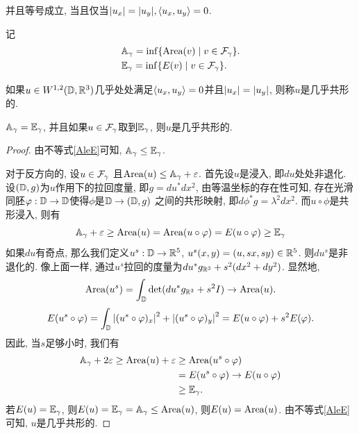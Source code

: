 并且等号成立, 当且仅当${\left | u_x \right |}={\left | u_y \right |}, {\left < u_x, u_y \right >}=0$.
\par 记
\begin{align}
    &{\mathbb{A}_\gamma}=\inf\{\text{Area}(v)\mid v \in {\mathcal{F}_\gamma}\}.\\
    &{\mathbb{E}_\gamma}=\inf \{{E}(v)\mid v \in {\mathcal{F}_\gamma}\}.
\end{align}
\begin{definition}
    如果$u \in W^{1,2}(\mathbb{D},{\mathbb{R}}^3)$几乎处处满足${\left < u_x, u_y \right >}=0$并且${\left | u_x \right |} = {\left | u_y \right |}$, 则称$u$是几乎共形的.
\end{definition}
\begin{lemma}\label{ageg}
    ${\mathbb{A}_\gamma}={\mathbb{E}_\gamma}$, 并且如果$u \in {\mathcal{F}_\gamma}$取到${\mathbb{E}_\gamma}$, 则$u$是几乎共形的.
\end{lemma}
\begin{proof}
    由不等式\eqref{AleE}可知, ${\mathbb{A}_\gamma} \le {\mathbb{E}_\gamma}$.
    \par 对于反方向的, 设$u\in {\mathcal{F}_\gamma}$ 且$\text{Area}(u) \le {\mathbb{A}_\gamma} + \varepsilon$. 首先设$u$是浸入, 即$du$处处非退化. 设$({\mathbb{D}},g)$为$u$作用下的拉回度量, 即$g=du^*dx^2$, 由等温坐标的存在性可知, 存在光滑同胚${\varphi}: {\mathbb{D}} \to {\mathbb{D}}$使得$\phi$是$\mathbb{D} \to ({\mathbb{D}},g)$ 之间的共形映射, 即$d\phi ^* g=\lambda^2dx^2$. 而$u\circ \phi$是共形浸入, 则有
    \begin{equation}
        {\mathbb{A}_\gamma}+\varepsilon\ge \text{Area}(u)=\text{Area}(u\circ {\varphi})={E}(u\circ {\varphi}) \ge {\mathbb{E}_\gamma}
    \end{equation}
    如果$du$有奇点, 那么我们定义$u^s: {\mathbb{D}} \to {\mathbb{R}}^5$, $u^s(x,y)=(u,sx,sy)\in {\mathbb{R}}^5$. 则$du^s$是非退化的. 像上面一样, 通过$u^s$拉回的度量为$du^*g_{{\mathbb{R}}^3}+s^2(dx^2+dy^2)$. 显然地, 
    \begin{equation}
        \text{Area}(u^s)=\int_{\mathbb{D}} \det (du^*g_{{\mathbb{R}}^3}+s^2I)  \to \text{Area}(u).
    \end{equation}
    \begin{equation}
        {E}(u^s\circ{\varphi})=\int_{\mathbb{D}} {\left | (u^s\circ {\varphi})_x \right |}^2+ {\left | (u^s\circ {\varphi})_y \right |}^2 ={E}(u\circ {\varphi})+s^2{E}({\varphi}).
    \end{equation}
    因此, 当$s$足够小时, 我们有
    \begin{equation}
        \begin{split}
            {\mathbb{A}_\gamma}+2\varepsilon \ge \text{Area}(u)+\varepsilon & \ge \text{Area}(u^s\circ {\varphi})  \\
            &= {E}(u^s\circ {\varphi})  \to {E}(u\circ {\varphi}) \\
            &\ge {\mathbb{E}_\gamma}.
        \end{split}
    \end{equation}
    若$E(u)={\mathbb{E}_\gamma}$, 则$E(u)= {\mathbb{E}_\gamma} = {\mathbb{A}_\gamma} \le \text{Area}(u)$, 则$E(u)=\text{Area}(u)$. 由不等式\eqref{AleE}可知, $u$是几乎共形的.
\end{proof}
